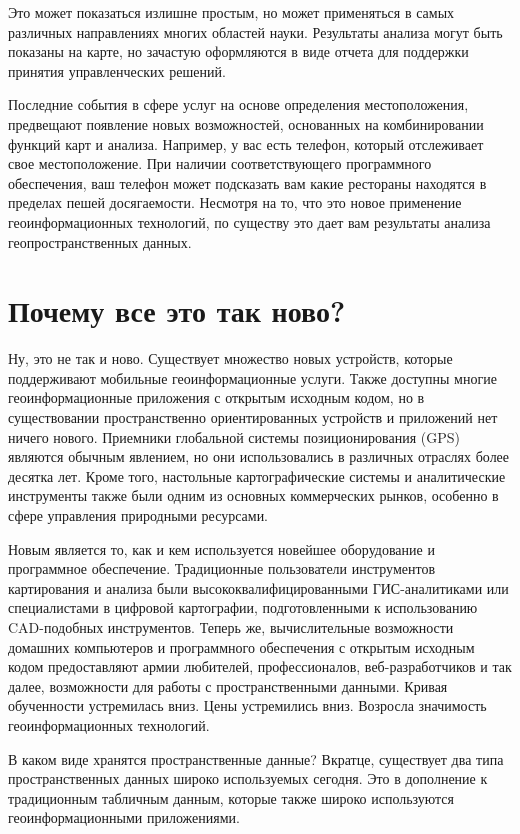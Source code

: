 Это может показаться излишне простым, но может применяться в самых
различных направлениях многих областей науки. Результаты анализа могут
быть показаны на карте, но зачастую оформляются в виде отчета для
поддержки принятия управленческих решений.

Последние события в сфере услуг на основе определения местоположения,
предвещают появление новых возможностей, основанных на комбинировании
функций карт и анализа. Например, у вас есть телефон, который
отслеживает свое местоположение. При наличии соответствующего
программного обеспечения, ваш телефон может подсказать вам какие
рестораны находятся в пределах пешей досягаемости. Несмотря на то, что
это новое применение геоинформационных технологий, по существу это дает
вам результаты анализа геопространственных данных.

\section{Почему все это так ново?}\label{label_whynew}

Ну, это не так и ново. Существует множество новых устройств, которые
поддерживают мобильные геоинформационные услуги. Также доступны многие
геоинформационные приложения с открытым исходным кодом, но в
существовании пространственно ориентированных устройств и приложений нет
ничего нового. Приемники глобальной системы позиционирования (GPS)
являются обычным явлением, но они использовались в различных отраслях
более десятка лет. Кроме того, настольные картографические системы
и аналитические инструменты также были одним из основных коммерческих
рынков, особенно в сфере управления природными ресурсами.

Новым является то, как и кем используется новейшее оборудование и
программное обеспечение. Традиционные пользователи инструментов
картирования и анализа были высококвалифицированными ГИС-аналитиками или
специалистами в цифровой картографии, подготовленными к использованию
CAD-подобных инструментов. Теперь же, вычислительные возможности
домашних компьютеров и программного обеспечения с открытым исходным
кодом предоставляют армии любителей, профессионалов, веб-разработчиков
и так далее, возможности для работы с пространственными данными. Кривая
обученности устремилась вниз. Цены устремились вниз. Возросла значимость
геоинформационных технологий.

В каком виде хранятся пространственные данные? Вкратце, существует два
типа пространственных данных широко используемых сегодня. Это в
дополнение к традиционным табличным данным, которые также широко
используются геоинформационными приложениями.

